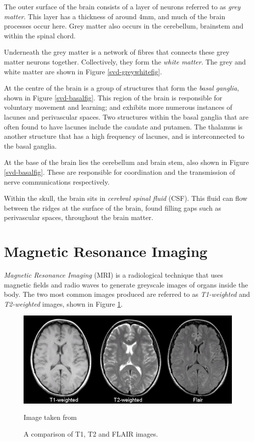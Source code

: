 The outer surface of the brain consists of a layer of neurons referred to as \textit{grey matter}. This layer has a thickness of around 4mm, and much of the brain processes occur here. Grey matter also occurs in the cerebellum, brainstem and within the spinal chord.

Underneath the grey matter is a network of fibres that connects these grey matter neurons together. Collectively, they form the \textit{white matter}. The grey and white matter are shown in Figure \ref{svd-greywhitefig}.

At the centre of the brain is a group of structures that form the \textit{basal ganglia}, shown in Figure \ref{svd-basalfig}. This region of the brain is responsible for voluntary movement and learning; and exhibits more numerous instances of lacunes and perivascular spaces. Two structures within the basal ganglia that are often found to have lacunes include the caudate and putamen. The thalamus is another structure that has a high frequency of lacunes, and is interconnected to the basal ganglia.

At the base of the brain lies the cerebellum and brain stem, also shown in Figure \ref{svd-basalfig}. These are responsible for coordination and the transmission of nerve communications respectively.

Within the skull, the brain sits in \textit{cerebral spinal fluid} (CSF). This fluid can flow between the ridges  at the surface of the brain, found filling gaps such as perivascular spaces, throughout the brain matter.


\section{Magnetic Resonance Imaging}\label{svd-MRI}

\textit{Magnetic Resonance Imaging }(MRI) is a radiological technique that uses magnetic fields and radio waves to generate greyscale images of organs inside the body. The two most common images produced are referred to as \textit{T1-weighted} and \textit{T2-weighted} images, shown in Figure \ref{svd-t1-vs-t2}.

\begin{figure}[ht]
	\centering
	\includegraphics[width=\textwidth]{Images/2_t1_t2_flair.jpg}
	\caption{A comparison of T1, T2 and FLAIR images.}
	\small Image taken from \cite{Preston2006}
	\label{svd-t1-vs-t2}
\end{figure}

